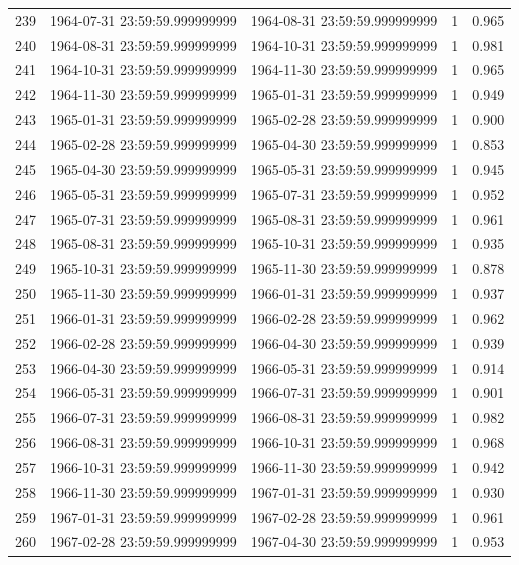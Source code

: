 \begin{table}
\begin{tabular}{lcccc}
239 & 1964-07-31 23:59:59.999999999 & 1964-08-31 23:59:59.999999999 & 1 & 0.965 \\
240 & 1964-08-31 23:59:59.999999999 & 1964-10-31 23:59:59.999999999 & 1 & 0.981 \\
241 & 1964-10-31 23:59:59.999999999 & 1964-11-30 23:59:59.999999999 & 1 & 0.965 \\
242 & 1964-11-30 23:59:59.999999999 & 1965-01-31 23:59:59.999999999 & 1 & 0.949 \\
243 & 1965-01-31 23:59:59.999999999 & 1965-02-28 23:59:59.999999999 & 1 & 0.900 \\
244 & 1965-02-28 23:59:59.999999999 & 1965-04-30 23:59:59.999999999 & 1 & 0.853 \\
245 & 1965-04-30 23:59:59.999999999 & 1965-05-31 23:59:59.999999999 & 1 & 0.945 \\
246 & 1965-05-31 23:59:59.999999999 & 1965-07-31 23:59:59.999999999 & 1 & 0.952 \\
247 & 1965-07-31 23:59:59.999999999 & 1965-08-31 23:59:59.999999999 & 1 & 0.961 \\
248 & 1965-08-31 23:59:59.999999999 & 1965-10-31 23:59:59.999999999 & 1 & 0.935 \\
249 & 1965-10-31 23:59:59.999999999 & 1965-11-30 23:59:59.999999999 & 1 & 0.878 \\
250 & 1965-11-30 23:59:59.999999999 & 1966-01-31 23:59:59.999999999 & 1 & 0.937 \\
251 & 1966-01-31 23:59:59.999999999 & 1966-02-28 23:59:59.999999999 & 1 & 0.962 \\
252 & 1966-02-28 23:59:59.999999999 & 1966-04-30 23:59:59.999999999 & 1 & 0.939 \\
253 & 1966-04-30 23:59:59.999999999 & 1966-05-31 23:59:59.999999999 & 1 & 0.914 \\
254 & 1966-05-31 23:59:59.999999999 & 1966-07-31 23:59:59.999999999 & 1 & 0.901 \\
255 & 1966-07-31 23:59:59.999999999 & 1966-08-31 23:59:59.999999999 & 1 & 0.982 \\
256 & 1966-08-31 23:59:59.999999999 & 1966-10-31 23:59:59.999999999 & 1 & 0.968 \\
257 & 1966-10-31 23:59:59.999999999 & 1966-11-30 23:59:59.999999999 & 1 & 0.942 \\
258 & 1966-11-30 23:59:59.999999999 & 1967-01-31 23:59:59.999999999 & 1 & 0.930 \\
259 & 1967-01-31 23:59:59.999999999 & 1967-02-28 23:59:59.999999999 & 1 & 0.961 \\
260 & 1967-02-28 23:59:59.999999999 & 1967-04-30 23:59:59.999999999 & 1 & 0.953 \\

\end{tabular}
\end{table}
